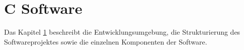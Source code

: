 \section{C Software}
\label{sec:Firmware}

Das Kapitel \ref{sec:Firmware} beschreibt die Entwicklungsumgebung, die Strukturierung des Softwareprojektes sowie die einzelnen Komponenten der Software.

